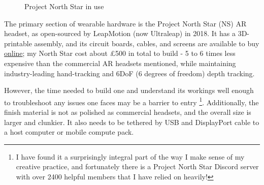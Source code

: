 \begin{figure}
    \centering
    \hfill
    \caption{Project North Star in use}
\end{figure}

The primary section of wearable hardware is the Project North Star (NS) AR headset, as open-sourced by LeapMotion (now Ultraleap) in 2018. It has a 3D-printable assembly, and its circuit boards, cables, and screens are available to buy \href{https://docs.projectnorthstar.org}{online}; my North Star cost about £500 in total to build - 5 to 6 times less expensive than the commercial AR headsets mentioned, while maintaining industry-leading hand-tracking and 6DoF (6 degrees of freedom) depth tracking.

However, the time needed to build one and understand its workings well enough to trouble\-shoot any issues one faces may be a barrier to entry \footnote{I have found it a surprisingly integral part of the way I make sense of my creative practice, and fortunately there is a Project North Star Discord server with over 2400 helpful members that I have relied on heavily!}. Additionally, the finish material is not as polished as commercial headsets, and the overall size is larger and clunkier. It also needs to be tethered by USB and DisplayPort cable to a host computer or mobile compute pack.

